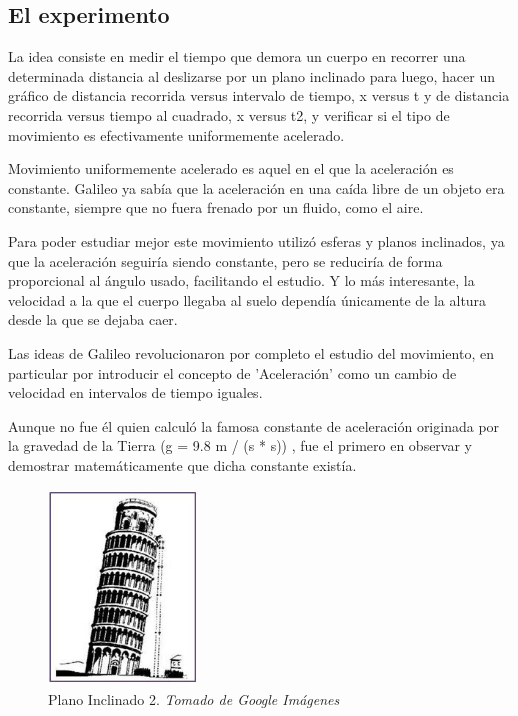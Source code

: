 \documentclass[journal]{IEEEtran}
\begin{document}
\subsection{El experimento}

La idea consiste en medir el tiempo que demora un cuerpo en recorrer una determinada distancia al deslizarse por un plano inclinado para luego, hacer un gráfico de distancia recorrida versus intervalo de tiempo, x versus t y de distancia recorrida versus tiempo al cuadrado, x versus t2, y verificar si el tipo de movimiento es efectivamente uniformemente acelerado.

Movimiento uniformemente acelerado es aquel en el que la aceleración es constante. Galileo ya sabía que la aceleración en una caída libre de un objeto era constante, siempre que no fuera frenado por un fluido, como el aire. 

Para poder estudiar mejor este movimiento utilizó esferas y planos inclinados, ya que la aceleración seguiría siendo constante, pero se reduciría de forma proporcional al ángulo usado, facilitando el estudio. Y lo más interesante, la velocidad a la que el cuerpo llegaba al suelo dependía únicamente de la altura desde la que se dejaba caer.

Las ideas de Galileo revolucionaron por completo el estudio del movimiento, en particular por introducir el concepto de 'Aceleración' como un cambio de velocidad en intervalos de tiempo iguales. 

Aunque no fue él quien calculó la famosa constante de aceleración originada por la gravedad de la Tierra (g = 9.8 m / (s * s)) , fue el primero en observar y demostrar matemáticamente que dicha constante existía.
 
\begin{center}
  \begin{figure}[h!]
  \includegraphics[width=40mm]{plano_inclinado2.jpg}
  \caption{Plano Inclinado 2. \emph{Tomado de Google Imágenes}}
  \end{figure}
\end{center}
\end{document}
